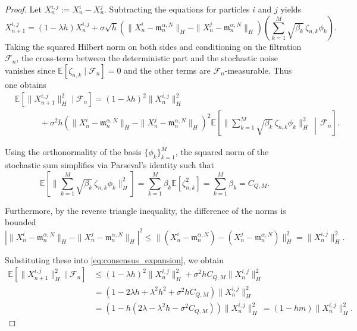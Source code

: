 \documentclass[12pt]{amsart}
\numberwithin{equation}{section}
\begin{document}
\begin{proof}
Let $X_n^{i,j} := X_n^i - X_n^j$. Subtracting the equations for particles $i$ and $j$ yields
\begin{equation*}
    X_{n+1}^{i,j} = (1 - \lambda h)X_n^{i,j} + \sigma \sqrt{h} \left( \|X_n^i - \mathfrak{m}_n^{\alpha, N}\|_H - \|X_n^j - \mathfrak{m}_n^{\alpha, N}\|_H \right) \left( \sum_{k=1}^M \sqrt{\beta_k}\, \zeta_{n,k} \phi_k \right).
\end{equation*}
Taking the squared Hilbert norm on both sides and conditioning on the filtration $\mathcal{F}_n$, the cross-term between the deterministic part and the stochastic noise vanishes since $\mathbb{E}[\zeta_{n,k} \mid \mathcal{F}_n] = 0$ and the other terms are $\mathcal{F}_n$-measurable. Thus one obtains
\begin{equation}\label{eq:consensus_expansion}
\begin{aligned}
    & \mathbb{E}[\|X_{n+1}^{i,j}\|_H^2 \mid \mathcal{F}_n] = (1 - \lambda h)^2 \|X_n^{i,j}\|_H^2 \\
    &\quad\qquad + \sigma^2 h \left( \|X_n^i - \mathfrak{m}_n^{\alpha, N}\|_H - \|X_n^j - \mathfrak{m}_n^{\alpha, N}\|_H \right)^2 \mathbb{E}\left[ \big\| \sum_{k=1}^M \sqrt{\beta_k}\, \zeta_{n,k} \phi_k \big\|_H^2 \,\middle|\, \mathcal{F}_n \right]. 
\end{aligned}
\end{equation}

Using the orthonormality of the basis $\{\phi_k\}_{k=1}^M$, the squared norm of the stochastic sum simplifies via Parseval's identity such that
\begin{equation*}
    \mathbb{E}\left[ \big\| \sum_{k=1}^M \sqrt{\beta_k}\, \zeta_{n,k} \phi_k \big\|_H^2 \right] = \sum_{k=1}^M \beta_k \mathbb{E}[\zeta_{n,k}^2] = \sum_{k=1}^M \beta_k = C_{Q,M}.
\end{equation*}

Furthermore, by the reverse triangle inequality, the difference of the norms is bounded
\begin{equation*}
    \left| \|X_n^i - \mathfrak{m}_n^{\alpha, N}\|_H - \|X_n^j - \mathfrak{m}_n^{\alpha, N}\|_H \right|^2 \le \| (X_n^i - \mathfrak{m}_n^{\alpha, N}) - (X_n^j - \mathfrak{m}_n^{\alpha, N}) \|_H^2 = \|X_n^{i,j}\|_H^2.
\end{equation*}

Substituting these into \eqref{eq:consensus_expansion}, we obtain
\begin{align*}
    \mathbb{E}[\|X_{n+1}^{i,j}\|_H^2 \mid \mathcal{F}_n] &\le (1 - \lambda h)^2 \|X_n^{i,j}\|_H^2 + \sigma^2 h C_{Q,M} \|X_n^{i,j}\|_H^2 \\
    &= \left( 1 - 2\lambda h + \lambda^2 h^2 + \sigma^2 h C_{Q,M} \right) \|X_n^{i,j}\|_H^2 \\
    &= \left( 1 - h(2\lambda - \lambda^2 h - \sigma^2 C_{Q,M}) \right) \|X_n^{i,j}\|_H^2 \,
    = (1 - hm) \|X_n^{i,j}\|_H^2.
\end{align*}


\end{proof}
\end{document}

